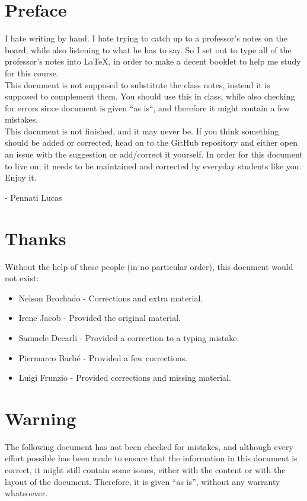 \section*{Preface}
I hate writing by hand. I hate trying to catch up to a professor's notes on the board, while also listening to what he has to say. So I set out to type all of the professor's notes into \LaTeX, in order to make a decent booklet to help me study for this course.\\

This document is not supposed to substitute the class notes, instead it is supposed to complement them. You should use this in class, while also checking for errors since document is given ``as is``, and therefore it might contain a few mistakes.\\

This document is not finished, and it may never be. If you think something should be added or corrected, head on to the GitHub repository and either open an issue with the suggestion or add/correct it yourself. In order for this document to live on, it needs to be maintained and corrected by everyday students like you.\\

\noindent Enjoy it.
\begin{flushright}
- Pennati Lucas
\end{flushright}
\section*{Thanks}
Without the help of these people (in no particular order), this document would not exist:
\begin{itemize}
\item Nelson Brochado - Corrections and extra material.
\item Irene Jacob - Provided the original material.
\item Samuele Decarli - Provided a correction to a typing mistake.
\item Piermarco Barb\'{e} - Provided a few corrections.
\item Luigi Frunzio - Provided corrections and missing material.
\end{itemize}
\section*{Warning}
The following document has not been checked for mistakes, and although every effort possible has been made to ensure that the information in this document is correct, it might still contain some issues, either with the content or with the layout of the document. Therefore, it is given ``as is'', without any warranty whatsoever. \\

